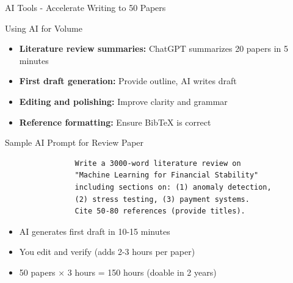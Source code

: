 \documentclass[11pt]{beamer}
\begin{document}
	\begin{frame}{AI Tools - Accelerate Writing to 50 Papers}
		\scriptsize
		\begin{block}{Using AI for Volume}
			\begin{itemize}
				\item \textbf{Literature review summaries:} ChatGPT summarizes 20 papers in 5 minutes
				\item \textbf{First draft generation:} Provide outline, AI writes draft
				\item \textbf{Editing and polishing:} Improve clarity and grammar
				\item \textbf{Reference formatting:} Ensure BibTeX is correct
			\end{itemize}
		\end{block}
		\begin{block}{Sample AI Prompt for Review Paper}
			\begin{verbatim}
				Write a 3000-word literature review on 
				"Machine Learning for Financial Stability" 
				including sections on: (1) anomaly detection, 
				(2) stress testing, (3) payment systems. 
				Cite 50-80 references (provide titles).
			\end{verbatim}
			\begin{itemize}
				\item AI generates first draft in 10-15 minutes
				\item You edit and verify (adds 2-3 hours per paper)
				\item 50 papers × 3 hours = 150 hours (doable in 2 years)
			\end{itemize}
		\end{block}
	\end{frame}
	
\end{document}
